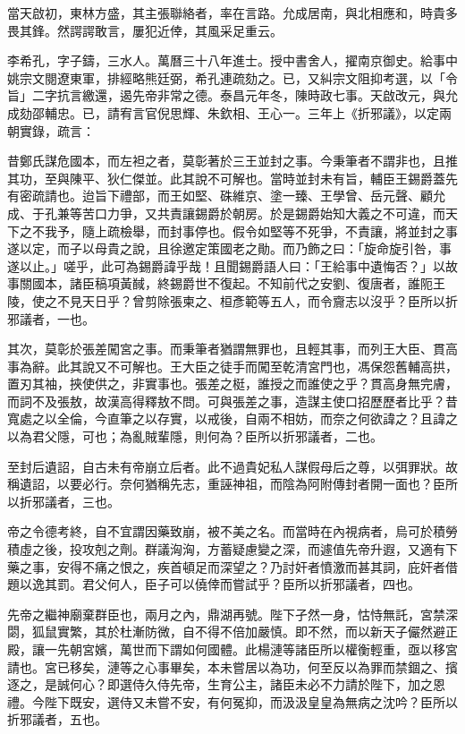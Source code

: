\begin{pinyinscope}
當天啟初，東林方盛，其主張聯絡者，率在言路。允成居南，與北相應和，時貴多畏其鋒。然諤諤敢言，屢犯近倖，其風采足重云。

李希孔，字子鑄，三水人。萬曆三十八年進士。授中書舍人，擢南京御史。給事中姚宗文閱遼東軍，排經略熊廷弼，希孔連疏劾之。已，又糾宗文阻抑考選，以「令旨」二字抗言繳還，遏先帝非常之德。泰昌元年冬，陳時政七事。天啟改元，與允成劾邵輔忠。已，請宥言官倪思輝、朱欽相、王心一。三年上《折邪議》，以定兩朝實錄，疏言：

昔鄭氏謀危國本，而左袒之者，莫彰著於三王並封之事。今秉筆者不謂非也，且推其功，至與陳平、狄仁傑並。此其說不可解也。當時並封未有旨，輔臣王錫爵蓋先有密疏請也。迨旨下禮部，而王如堅、硃維京、塗一臻、王學曾、岳元聲、顧允成、于孔兼等苦口力爭，又共責讓錫爵於朝房。於是錫爵始知大義之不可違，而天下之不我予，隨上疏檢舉，而封事停也。假令如堅等不死爭，不責讓，將並封之事遂以定，而子以母貴之說，且徐邀定策國老之勛。而乃飾之曰：「旋命旋引咎，事遂以止。」嗟乎，此可為錫爵諱乎哉！且聞錫爵語人曰：「王給事中遺悔否？」以故事關國本，諸臣稿項黃馘，終錫爵世不復起。不知前代之安劉、復唐者，誰阨王陵，使之不見天日乎？曾剪除張柬之、桓彥範等五人，而令齎志以沒乎？臣所以折邪議者，一也。

其次，莫彰於張差闖宮之事。而秉筆者猶謂無罪也，且輕其事，而列王大臣、貫高事為辭。此其說又不可解也。王大臣之徒手而闖至乾清宮門也，馮保怨舊輔高拱，置刃其袖，挾使供之，非實事也。張差之梃，誰授之而誰使之乎？貫高身無完膚，而詞不及張敖，故漢高得釋敖不問。可與張差之事，造謀主使口招歷歷者比乎？昔寬處之以全倫，今直筆之以存實，以戒後，自兩不相妨，而奈之何欲諱之？且諱之以為君父隱，可也；為亂賊輩隱，則何為？臣所以折邪議者，二也。

至封后遺詔，自古未有帝崩立后者。此不過貴妃私人謀假母后之尊，以弭罪狀。故稱遺詔，以要必行。奈何猶稱先志，重誣神祖，而陰為阿附傳封者開一面也？臣所以折邪議者，三也。

帝之令德考終，自不宜謂因藥致崩，被不美之名。而當時在內視病者，烏可於積勞積虛之後，投攻剋之劑。群議洶洶，方蓄疑慮變之深，而遽值先帝升遐，又適有下藥之事，安得不痛之恨之，疾首頓足而深望之？乃討奸者憤激而甚其詞，庇奸者借題以逸其罰。君父何人，臣子可以僥倖而嘗試乎？臣所以折邪議者，四也。

先帝之繼神廟棄群臣也，兩月之內，鼎湖再號。陛下孑然一身，怙恃無託，宮禁深閟，狐鼠實繁，其於杜漸防微，自不得不倍加嚴慎。即不然，而以新天子儼然避正殿，讓一先朝宮嬪，萬世而下謂如何國體。此楊漣等諸臣所以權衡輕重，亟以移宮請也。宮已移矣，漣等之心事畢矣，本未嘗居以為功，何至反以為罪而禁錮之、擯逐之，是誠何心？即選侍久侍先帝，生育公主，諸臣未必不力請於陛下，加之恩禮。今陛下既安，選侍又未嘗不安，有何冤抑，而汲汲皇皇為無病之沈吟？臣所以折邪議者，五也。


\end{pinyinscope}
